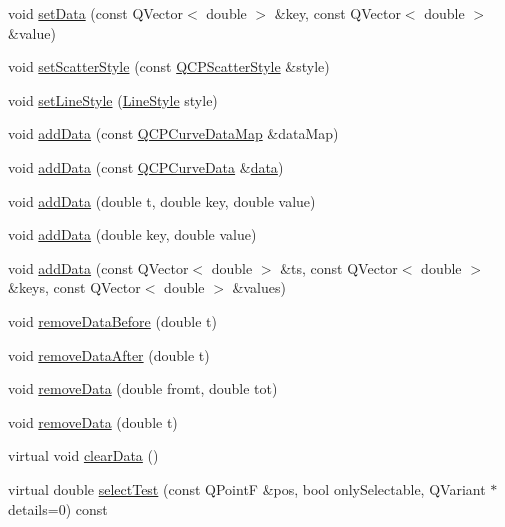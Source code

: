 \begin{DoxyCompactItemize}
\item 
void \hyperlink{classQCPCurve_a963d4c45777deef15848a8f56172d066}{set\+Data} (const Q\+Vector$<$ double $>$ \&key, const Q\+Vector$<$ double $>$ \&value)
\item 
void \hyperlink{classQCPCurve_a55e43b44709bf50a35500644988aa706}{set\+Scatter\+Style} (const \hyperlink{classQCPScatterStyle}{Q\+C\+P\+Scatter\+Style} \&style)
\item 
void \hyperlink{classQCPCurve_a4a377ec863ff81a1875c3094a6177c19}{set\+Line\+Style} (\hyperlink{classQCPCurve_a2710e9f79302152cff794c6e16cc01f1}{Line\+Style} style)
\item 
void \hyperlink{classQCPCurve_a4e24023c3b9ac75440c7a260172c99af}{add\+Data} (const \hyperlink{qcustomplot_8h_a444d37ec9cb2951b3a7fe443c34d1658}{Q\+C\+P\+Curve\+Data\+Map} \&data\+Map)
\item 
void \hyperlink{classQCPCurve_ad304326aba096911f92452d8bfe0470e}{add\+Data} (const \hyperlink{classQCPCurveData}{Q\+C\+P\+Curve\+Data} \&\hyperlink{classQCPCurve_a9ac194d35d4f334923aac9df1bf599ca}{data})
\item 
void \hyperlink{classQCPCurve_a13398b236f6926014e404eeb5b9f415c}{add\+Data} (double t, double key, double value)
\item 
void \hyperlink{classQCPCurve_ada4762e793cd5707b33f35b8a4b0f8fb}{add\+Data} (double key, double value)
\item 
void \hyperlink{classQCPCurve_a27c8b3dddd4067d626397ee199626722}{add\+Data} (const Q\+Vector$<$ double $>$ \&ts, const Q\+Vector$<$ double $>$ \&keys, const Q\+Vector$<$ double $>$ \&values)
\item 
void \hyperlink{classQCPCurve_af6f4284fbc2f34e676f24dce03c34fe5}{remove\+Data\+Before} (double t)
\item 
void \hyperlink{classQCPCurve_a0365cb947c4e6d405ee22e00191d5f52}{remove\+Data\+After} (double t)
\item 
void \hyperlink{classQCPCurve_ad45bb5479be799163028ef2b776f7221}{remove\+Data} (double fromt, double tot)
\item 
void \hyperlink{classQCPCurve_a30c91acfa591ec534c49fed4c0fca39a}{remove\+Data} (double t)
\item 
virtual void \hyperlink{classQCPCurve_ae0462c61dbfbac07db0736ec64110241}{clear\+Data} ()
\item 
virtual double \hyperlink{classQCPCurve_a5af9949e725704811bbc81ecd5970b8e}{select\+Test} (const Q\+PointF \&pos, bool only\+Selectable, Q\+Variant $\ast$details=0) const 
\end{DoxyCompactItemize}
